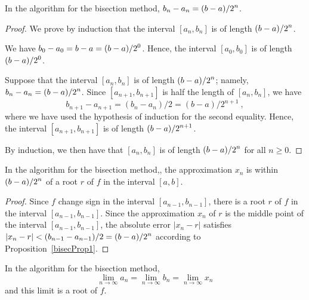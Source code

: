 \begin{prop}
In the algorithm for the bisection method,
$\displaystyle b_n - a_n = (b-a)/2^n$.
\label{bisecProp1}
\end{prop}

\begin{proof}
We prove by induction that the interval $[a_n,b_n]$ is of length
$\displaystyle (b-a)/2^n$.

We have $\displaystyle b_0 - a_0 = b - a = (b-a)/2^0$.  Hence, the interval
$[a_0,b_0]$ is of length $\displaystyle (b-a)/2^0$.

Suppose that the interval $[a_n,b_n]$ is of length $\displaystyle (b-a)/2^n$;
namely, $\displaystyle b_n-a_n = (b-a)/2^n$.  Since $[a_{n+1},b_{n+1}]$ is
half the length of $[a_n,b_n]$, we have
\[
b_{n+1} - a_{n+1} = (b_n-a_n)/2 = (b-a)/2^{n+1} \ ,
\]
where we have used the hypothesis of induction for the second
equality.  Hence, the interval $[a_{n+1},b_{n+1}]$ is of length
$\displaystyle (b-a)/2^{n+1}$.

By induction, we then have that $[a_n,b_n]$ is of length
$\displaystyle (b-a)/2^n$ for all $n\geq 0$.
\end{proof}

\begin{cor}
In the algorithm for the bisection method,, the approximation $x_{n}$
is within $\displaystyle (b-a)/2^n$ of a root $r$ of $f$ in the
interval $[a,b]$.
\label{bisectCor}
\end{cor}

\begin{proof}
Since $f$ change sign in the interval $[a_{n-1},b_{n-1}]$, there is a
root $r$ of $f$ in the interval $[a_{n-1},b_{n-1}]$.
Since the approximation $x_n$ of $r$ is the middle point of the
interval $[a_{n-1},b_{n-1}]$, the absolute error $|x_n - r |$ 
satisfies $\displaystyle |x_n - r | < (b_{n-1} - a_{n-1})/2 = (b-a)/2^n$
according to Proposition~\ref{bisecProp1}.
\end{proof}

\begin{prop}
In the algorithm for the bisection method,
\[
\lim_{n\rightarrow \infty} a_n = \lim_{n\rightarrow \infty} b_n
= \lim_{n\rightarrow \infty} x_n
\]
and this limit is a root of $f$.
\end{prop}

